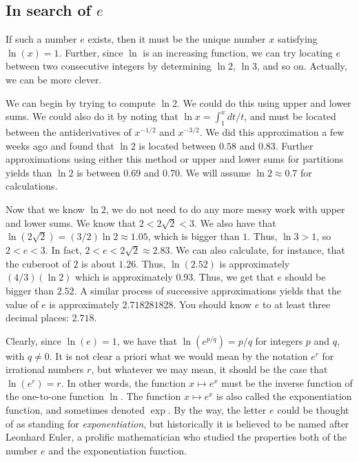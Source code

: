 \documentclass[10pt]{amsart}
\begin{document}
\subsection{In search of $e$}

If such a number $e$ exists, then it must be the unique number $x$
satisfying $\ln (x) = 1$. Further, since $\ln$ is an increasing
function, we can try locating $e$ between two consecutive integers by
determining $\ln 2$, $\ln 3$, and so on. Actually, we can be more
clever.

We can begin by trying to compute $\ln 2$. We could do this using
upper and lower sums. We could also do it by noting that $\ln x =
\int_1^x dt/t$, and must be located between the antiderivatives of
$x^{-1/2}$ and $x^{-3/2}$. We did this approximation a few weeks ago
and found that $\ln 2$ is located between $0.58$ and $0.83$. Further
approximations using either this method or upper and lower sums for
partitions yields than $\ln 2$ is between $0.69$ and $0.70$. We will
assume $\ln 2 \approx 0.7$ for calculations.

Now that we know $\ln 2$, we do not need to do any more messy work
with upper and lower sums. We know that $2 < 2\sqrt{2} < 3$. We also
have that $\ln(2\sqrt{2}) = (3/2) \ln 2 \approx 1.05$, which is bigger
than $1$. Thus, $\ln 3 > 1$, so $2 < e < 3$. In fact, $2 < e <
2\sqrt{2} \approx 2.83$. We can also calculate, for instance, that the
cuberoot of $2$ is about $1.26$. Thus, $\ln(2.52)$ is approximately
$(4/3)(\ln 2)$ which is approximately $0.93$. Thus, we get that $e$
should be bigger than $2.52$. A similar process of successive
approximations yields that the value of $e$ is approximately
$2.718281828$. You should know $e$ to at least three decimal
places: $2.718$.

Clearly, since $\ln(e) = 1$, we have that $\ln(e^{p/q}) = p/q$ for
integers $p$ and $q$, with $q \ne 0$. It is not clear a priori what we
would mean by the notation $e^r$ for irrational numbers $r$, but
whatever we may mean, it should be the case that $\ln(e^r) = r$. In
other words, the function $x \mapsto e^x$ must be the inverse function
of the one-to-one function $\ln$. The function $x \mapsto e^x$ is also
called the exponentiation function, and sometimes denoted $\exp$. By
the way, the letter $e$ could be thought of as standing for {\em
exponentiation}, but historically it is believed to be named after
Leonhard Euler, a prolific mathematician who studied the properties
both of the number $e$ and the exponentiation function.
\end{document}
